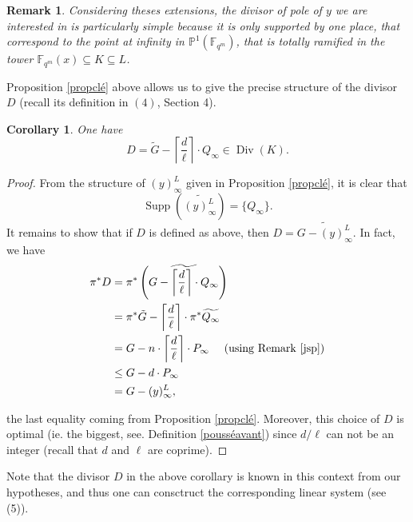 \documentclass[10pt]{article}
\newtheorem{coro1}[thm]{Corollary}
\newtheorem{rq1}[thm]{Remark}
\newcommand{\s}{\vspace{0.3cm}}
\newcommand{\cd}{\cdot}
\newcommand{\PP}{\mathbb{P}}
\newcommand{\fqm}{\mathbb{F}_{q^m}}
\newcommand{\su}{\subseteq}
\newcommand{\Div}{\operatorname{Div}}
\newcommand{\Supp}{\operatorname{Supp}}
\begin{document}
\s

\begin{rq1} \rm Considering theses extensions, the divisor of pole of $y$ we are interested in is particularly simple because it is only supported by one place, that correspond to the point at infinity in $\PP^1(\fqm)$, that is totally ramified in the tower $\fqm(x)\su K \su L$.
\end{rq1}

\s

Proposition \ref{propclé} above allows us to give the precise structure of the divisor $D$ (recall its definition in $(4)$, Section 4).

\s

\begin{coro1} \label{diviseurDKummer}
One have
\[D = \tilde{G} - \left\lceil\frac{d}{\ell}\right\rceil \cd Q_{\infty} \in \Div(K).\]
\end{coro1}

\s

\begin{proof}
From the structure of $(y)^L_{\infty}$ given in Proposition \ref{propclé}, it is clear that 
\[\Supp\left(\widetilde{(y)^L_{\infty}}\right) = \{Q_{\infty}\}.\]
It remains to show that if $D$ is defined as above, then $D = \widetilde{G - (y)^L_{\infty}}$. In fact, we have
\begin{align*}
\pi^*D &= \pi^* \left(\widetilde{G - \left\lceil\frac{d}{\ell}\right\rceil \cd Q_{\infty}}\right) \\
&= \pi^*\tilde{G} - \left\lceil\frac{d}{\ell}\right\rceil \cd \pi^*\widetilde{Q_{\infty}} \\
&= G - n \cd \left\lceil\frac{d}{\ell}\right\rceil \cd P_{\infty} \ \quad \rm (using \ Remark \ \ref{jsp}) \\
& \leq G - d \cd P_{\infty} \\
&= G-(y)^L_{\infty},
\end{align*}

the last equality coming from Proposition \ref{propclé}. Moreover, this choice of $D$ is optimal (ie. the biggest, see. Definition \ref{pousséavant}) since $d/\ell$ can not be an integer (recall that $d$ and $\ell$ are coprime).
\end{proof}

\s

Note that the divisor $D$ in the above corollary is known in this context from our hypotheses, and thus one can consctruct the corresponding linear system (see (5)).
\end{document}
